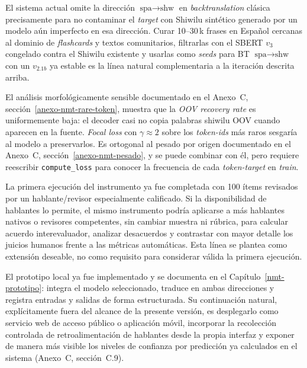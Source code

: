 \documentclass[12pt,a4paper,oneside]{book}
\begin{document}
\begin{description}[leftmargin=*]
  \item[Corpus monolingüe español controlado por dominio.] El sistema actual omite la dirección \(\text{spa}\rightarrow\text{shw}\) en \emph{backtranslation} clásica precisamente para no contaminar el \emph{target} con Shiwilu sintético generado por un modelo aún imperfecto en esa dirección. Curar 10--30\,k frases en Español cercanas al dominio de \emph{flashcards} y textos comunitarios, filtrarlas con el SBERT \(v_3\) congelado contra el Shiwilu existente y usarlas como \emph{seeds} para BT \(\text{spa}\rightarrow\text{shw}\) con un \(v_{2.1b}\) ya estable es la línea natural complementaria a la iteración descrita arriba.
  \item[\emph{Focal loss} para preservación de \emph{rare-tokens}.] El análisis morfológicamente sensible documentado en el Anexo~C, sección~\ref{anexo-nmt-rare-token}, muestra que la \emph{OOV recovery rate} es uniformemente baja: el decoder casi no copia palabras shiwilu OOV cuando aparecen en la fuente. \emph{Focal loss} con \(\gamma\approx 2\) sobre los \emph{token-ids} más raros sesgaría al modelo a preservarlos. Es ortogonal al pesado por origen documentado en el Anexo~C, sección~\ref{anexo-nmt-pesado}, y se puede combinar con él, pero requiere reescribir \texttt{compute\_loss} para conocer la frecuencia de cada \emph{token-target} en \emph{train}.
  \item[Ampliación opcional multi-revisor de la validación participativa.] La primera ejecución del instrumento ya fue completada con 100 ítems revisados por un hablante/revisor especialmente calificado. Si la disponibilidad de hablantes lo permite, el mismo instrumento podría aplicarse a más hablantes nativos o revisores competentes, sin cambiar muestra ni rúbrica, para calcular acuerdo interevaluador, analizar desacuerdos y contrastar con mayor detalle los juicios humanos frente a las métricas automáticas. Esta línea se plantea como extensión deseable, no como requisito para considerar válida la primera ejecución.
  \item[Evolución del prototipo funcional hacia un servicio de acceso público.] El prototipo local ya fue implementado y se documenta en el Capítulo~\ref{nmt-prototipo}: integra el modelo seleccionado, traduce en ambas direcciones y registra entradas y salidas de forma estructurada. Su continuación natural, explícitamente fuera del alcance de la presente versión, es desplegarlo como servicio web de acceso público o aplicación móvil, incorporar la recolección controlada de retroalimentación de hablantes desde la propia interfaz y exponer de manera más visible los niveles de confianza por predicción ya calculados en el sistema (Anexo~C, sección~C.9).
\end{description}
\end{document}

